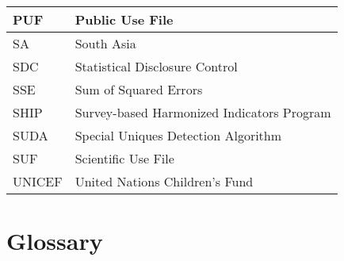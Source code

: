 \documentclass[letterpaper,10pt,english]{sphinxmanual}
\begin{document}
\begin{savenotes}
\begin{longtable}{|l|l|}
\hline
PUF
&
Public Use File
\\
\hline
SA
&
South Asia
\\
\hline
SDC
&
Statistical Disclosure Control
\\
\hline
SSE
&
Sum of Squared Errors
\\
\hline
SHIP
&
Survey-based Harmonized
Indicators Program
\\
\hline
SUDA
&
Special Uniques Detection
Algorithm
\\
\hline
SUF
&
Scientific Use File
\\
\hline
UNICEF
&
United Nations Children’s Fund
\\
\hline
\end{longtable}\sphinxatlongtableend\end{savenotes}


\section{Glossary}
\label{\detokenize{glossary_acr:glossary}}
\end{document}
